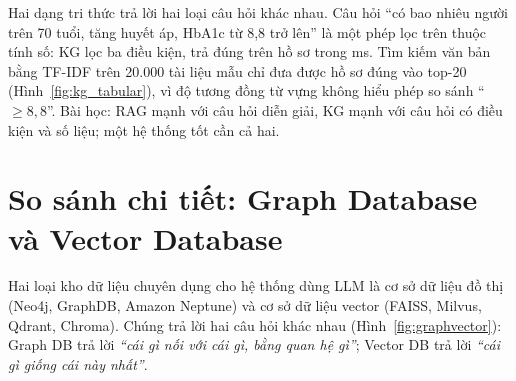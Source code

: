 


Hai dạng tri thức trả lời hai loại câu hỏi khác nhau. Câu hỏi ``có bao nhiêu người trên 70 tuổi, tăng huyết áp,
HbA1c từ 8,8 trở lên'' là một phép lọc trên thuộc tính số: KG lọc ba điều kiện, trả đúng
 trên  hồ sơ trong
 ms. Tìm kiếm văn bản bằng TF-IDF trên 20.000 tài liệu mẫu chỉ đưa được
 hồ sơ đúng vào top-20 (Hình~\ref{fig:kg_tabular}), vì độ tương
đồng từ vựng không hiểu phép so sánh ``$\ge 8{,}8$''. Bài học: RAG mạnh với câu hỏi diễn giải, KG mạnh với câu
hỏi có điều kiện và số liệu; một hệ thống tốt cần cả hai.


\section{So sánh chi tiết: Graph Database và Vector Database}
Hai loại kho dữ liệu chuyên dụng cho hệ thống dùng LLM là cơ sở dữ liệu đồ thị (Neo4j, GraphDB, Amazon
Neptune) và cơ sở dữ liệu vector (FAISS, Milvus, Qdrant, Chroma). Chúng trả lời hai câu hỏi khác nhau
(Hình~\ref{fig:graphvector}): Graph DB trả lời \emph{``cái gì nối với cái gì, bằng quan hệ gì''}; Vector DB trả
lời \emph{``cái gì giống cái này nhất''}.


